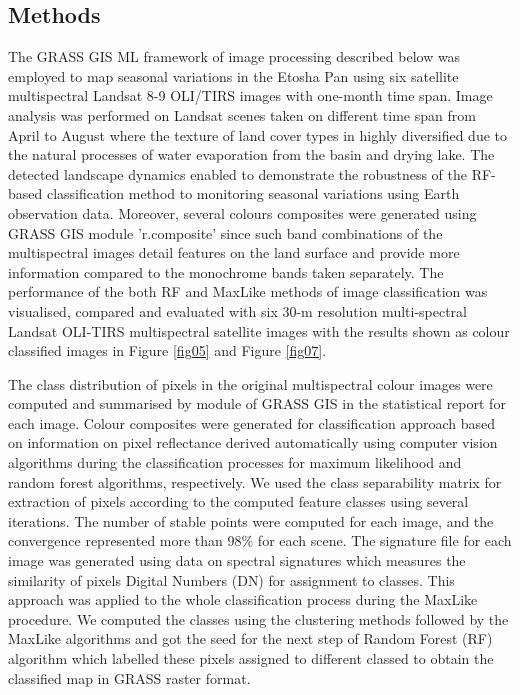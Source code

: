 \documentclass[draft]{agujournal2019}
\begin{document}
\subsection{Methods}

The GRASS GIS ML framework of image processing described below was employed to map seasonal variations in the Etosha Pan using six satellite multispectral Landsat 8-9 OLI/TIRS images with one-month time span. Image analysis was performed on Landsat scenes taken on different time span from April to August where the texture of land cover types in highly diversified due to the natural processes of water evaporation from the basin and drying lake. The detected landscape dynamics enabled to demonstrate the robustness of the RF-based classification method to monitoring seasonal variations using Earth observation data. Moreover, several colours composites were generated using GRASS GIS module 'r.composite' since such band combinations of the multispectral images detail features on the land surface  and provide more information compared to the monochrome bands taken separately. The performance of the both RF and MaxLike methods of image classification was visualised, compared  and evaluated with six 30-m resolution multi-spectral Landsat OLI-TIRS multispectral satellite images with the results shown as colour classified images in Figure \ref{fig05} and Figure \ref{fig07}. 

The class distribution of pixels in the original multispectral colour images were computed and summarised by module of GRASS GIS in the statistical report for each image. Colour composites were generated for classification approach based on information on pixel reflectance derived automatically using computer vision algorithms during the classification processes for maximum likelihood and random forest algorithms, respectively. We used the class separability matrix for extraction of pixels according to the computed feature classes using several iterations. The number of stable points were computed for each image, and the convergence represented more than 98\% for each scene. The signature file for each image was generated using data on spectral signatures which measures the similarity  of pixels Digital Numbers (DN) for assignment to classes. This approach was applied to the whole classification process during the MaxLike procedure. We computed the classes using the clustering methods followed by the MaxLike algorithms and got the seed for the next step of Random Forest (RF) algorithm which labelled these pixels assigned to different classed to obtain the classified map in GRASS raster format. 
\end{document}

